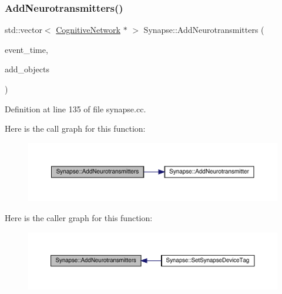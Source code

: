 \subsubsection{\texorpdfstring{Add\+Neurotransmitters()}{AddNeurotransmitters()}}
{\footnotesize\ttfamily std\+::vector$<$ \hyperlink{class_cognitive_network}{Cognitive\+Network} $\ast$ $>$ Synapse\+::\+Add\+Neurotransmitters (\begin{DoxyParamCaption}\item[{std\+::chrono\+::time\+\_\+point$<$ \hyperlink{universe_8h_a0ef8d951d1ca5ab3cfaf7ab4c7a6fd80}{Clock} $>$}]{event\+\_\+time,  }\item[{std\+::vector$<$ \hyperlink{class_cognitive_network}{Cognitive\+Network} $\ast$$>$}]{add\+\_\+objects }\end{DoxyParamCaption})}



Definition at line 135 of file synapse.\+cc.

Here is the call graph for this function\+:\nopagebreak
\begin{figure}[H]
\begin{center}
\leavevmode
\includegraphics[width=350pt]{class_synapse_a5ad01cc92c00d790b44472156065786e_cgraph}
\end{center}
\end{figure}
Here is the caller graph for this function\+:\nopagebreak
\begin{figure}[H]
\begin{center}
\leavevmode
\includegraphics[width=350pt]{class_synapse_a5ad01cc92c00d790b44472156065786e_icgraph}
\end{center}
\end{figure}
\mbox{\label{class_synapse_a1b52aa12cc7c28bfa2564e21ac17eb07}} 
